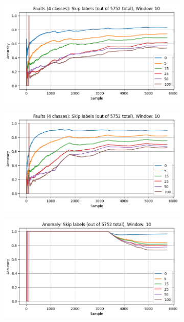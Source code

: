 \begin{figure}[ht]
    \centering
    \begin{subfigure}[b]{0.49\textwidth}
        \includegraphics[width=\textwidth]{assets/design/gradual-learning-skip-temporal-domain-fault.png}
        \caption{}
    \end{subfigure}
    \hfill
    \begin{subfigure}[b]{0.49\textwidth}
        \includegraphics[width=\textwidth]{assets/design/gradual-learning-skip-spectral-domain-fault.png}
        \caption{}
    \end{subfigure}
    \begin{subfigure}[b]{0.49\textwidth}
        \includegraphics[width=\textwidth]{assets/design/gradual-learning-skip-temporal-domain-anomaly60.png}

\end{subfigure}
\end{figure}
